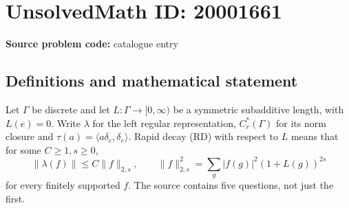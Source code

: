 \documentclass[11pt]{article}
\begin{document}
\section*{UnsolvedMath ID: 20001661}
\textbf{Source problem code:} catalogue entry
\subsection{Definitions and mathematical statement}
Let \(\Gamma\) be discrete and let \(L:\Gamma\to[0,\infty)\) be a symmetric subadditive length, with \(L(e)=0\). Write \(\lambda\) for the left regular representation, \(C_r^*(\Gamma)\) for its norm closure and \(\tau(a)=\langle a\delta_e,\delta_e\rangle\). Rapid decay (RD) with respect to \(L\) means that for some \(C\ge1,s\ge0\),
\[
 \|\lambda(f)\|\le C\|f\|_{2,s},\qquad
 \|f\|_{2,s}^2=\sum_g|f(g)|^2(1+L(g))^{2s}
\]
for every finitely supported \(f\). The source contains five questions, not just the first.
\end{document}
